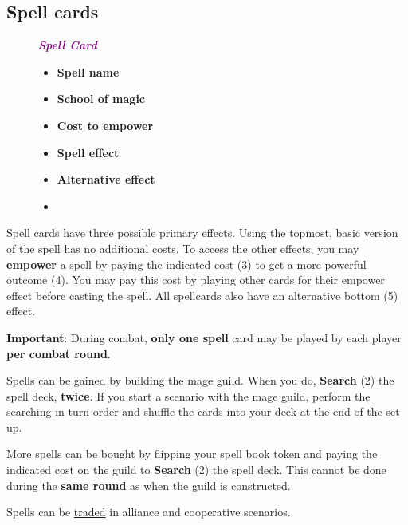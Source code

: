 \subsection*{\hypertarget{spells}{Spell cards}}
\begin{wrapfigure}{R}{0.50\textwidth}
    \begin{center}
  \begin{minipage}[t][5cm][t]{0.50\textwidth}
    \centering
    \vspace{0pt}
    \footnotesize{\textbf{\textit{\textcolor{purple}{Spell Card}}}}
    \scriptsize
    \begin{multicols}{2}
    \begin{itemize}[itemsep=5pt]
        \item[\textbf{1.}] \textbf{Spell name}
        \item[\textbf{2.}] \textbf{School of magic}
        \item[\textbf{3.}] \textbf{Cost to empower}
        \item[\textbf{4.}] \textbf{Spell effect}
        \item[\textbf{5.}] \textbf{Alternative effect}
        \item[]
    \end{itemize}
\end{multicols}
\end{minipage}\hfill
    \end{center}
\end{wrapfigure}


Spell cards have three possible primary effects.
Using the topmost, basic version of the spell has no additional costs.
To access the other effects, you may \textbf{empower} a spell by paying the indicated cost (3) to get a more powerful outcome (4).
You may pay this cost by playing other cards for their empower  effect before casting the spell.
All spellcards also have an alternative bottom (5)  effect.\par

\textbf{Important}: During combat, \textbf{only one spell} card may be played by each player \textbf{per combat round}.\par
Spells can be gained by building the mage guild.
When you do, \textbf{Search} (2) the spell deck, \textbf{twice}.
If you start a scenario with the mage guild, perform the searching in turn order and shuffle the cards into your deck at the end of the set up.\par
More spells can be bought by flipping your spell book token and paying the indicated cost on the guild to \textbf{Search} (2) the spell deck.
This cannot be done during the \textbf{same round} as when the guild is constructed.\par
Spells can be \hyperlink{Trading}{traded} in alliance and cooperative scenarios.

